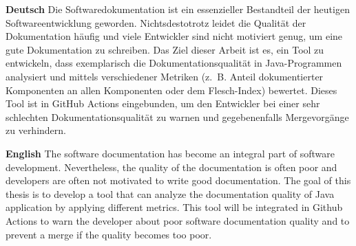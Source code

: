 \textbf{Deutsch}
Die Softwaredokumentation ist ein essenzieller Bestandteil der heutigen Softwareentwicklung geworden. Nichtsdestotrotz leidet die Qualität der Dokumentation häufig und viele Entwickler sind nicht motiviert genug, um eine gute Dokumentation zu schreiben. Das Ziel dieser Arbeit ist es, ein Tool zu entwickeln, dass exemplarisch die Dokumentationsqualität in Java-Programmen analysiert und mittels verschiedener Metriken (z.~B. Anteil dokumentierter Komponenten an allen Komponenten oder dem Flesch-Index) bewertet. Dieses Tool ist in GitHub Actions eingebunden, um den Entwickler bei einer sehr schlechten Dokumentationsqualität zu warnen und gegebenenfalls Mergevorgänge zu verhindern.

\bigskip

\noindent
\textbf{English} 
The software documentation has become an integral part of software development. Nevertheless, the quality of the documentation is often poor and developers are often not motivated to write good documentation. The goal of this thesis is to develop a tool that can analyze the documentation quality of Java application by applying different metrics. This tool will be integrated in Github Actions to warn the developer about poor software documentation quality and to prevent a merge if the quality becomes too poor.  

